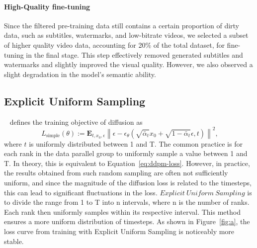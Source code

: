\paragraph{High-Quality fine-tuning}
Since the filtered pre-training data still contains a certain proportion of dirty data, such as subtitles, watermarks, and low-bitrate videos, we selected a subset of higher quality video data, accounting for 20\% of the total dataset, for fine-tuning in the final stage. This step effectively removed generated subtitles and watermarks and slightly improved the visual quality. However, we also observed a slight degradation in the model's semantic ability.


\subsection{Explicit Uniform Sampling}
~\citet{ho2020denoising} defines the training objective of diffusion as 
\begin{equation}~\label{eq:ddpm-loss}
    L_\mathrm{simple}(\theta) := \mathbf{E}_{t, x_0, \epsilon}{ \left\| \epsilon - \epsilon_\theta(\sqrt{\bar\alpha_t} x_0 + \sqrt{1-\bar\alpha_t}\epsilon, t) \right\|^2},
\end{equation}
where $t$ is uniformly distributed between 1 and T.
The common practice is for each rank in the data parallel group to uniformly sample a value between 1 and 
T. In theory, this is equivalent to Equation~\ref{eq:ddpm-loss}. However, in practice, the results obtained from such random sampling are often not sufficiently uniform, and since the magnitude of the diffusion loss is related to the timesteps, this can lead to significant fluctuations in the loss.
$Explicit\ Uniform\ Sampling$ is to divide the range from 1 to T into n intervals, where n is the number of ranks. Each rank then uniformly samples within its respective interval. This method ensures a more uniform distribution of timesteps. As shown in Figure~\ref{fig:a}, the loss curve from training with Explicit Uniform Sampling is noticeably more stable.
